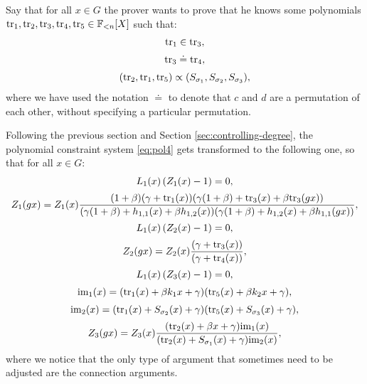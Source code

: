 \begin{example}\label{sec:concrete-example}
Say that for all $x \in G$ the prover wants to prove that he knows some polynomials $\text{tr}_1,\text{tr}_2,\text{tr}_3,\text{tr}_4,\text{tr}_5 \in \mathbb{F}_{<n}[X]$ such that:
\begin{align}\label{eq:pol4}
\begin{array}{c}
\text{tr}_1 \in \text{tr}_3, \\[0.2cm]
\text{tr}_3 \doteq \text{tr}_4, \\[0.2cm]
(\text{tr}_2,\text{tr}_1,\text{tr}_5) \propto (S_{\sigma_1},S_{\sigma_2},S_{\sigma_3}),
\end{array}
\end{align}
where we have used the notation $\doteq$ to denote that $c$ and $d$ are a permutation of each other, without specifying a particular permutation.

Following the previous section and Section \ref{sec:controlling-degree}, the polynomial constraint system \eqref{eq:pol4} gets transformed to the following one, so that for all $x \in G$:
\begin{align*}
\begin{array}{c}
  L_1(x) \left( Z_1(x) - 1\right) = 0, \\[0.2cm]
Z_1(gx) = \displaystyle Z_1(x)\frac{(1+\beta)(\gamma + \text{tr}_1(x))(\gamma(1+\beta) + \text{tr}_3(x) + \beta \text{tr}_3(gx))}{(\gamma(1+\beta) + {h_{1,1}}(x) + \beta {h_{1,2}}(x))(\gamma(1+\beta) + {h_{1,2}}(x) + \beta {h_{1,1}}(gx))}, \\[0.4cm]
L_1(x) \left( Z_2(x) - 1\right) = 0, \\[0.2cm]
Z_2(g x) = \displaystyle Z_2(x)\frac{(\gamma + \text{tr}_3(x))}{(\gamma + \text{tr}_4(x))}, \\[0.4cm]
L_1(x) \left( Z_3(x) - 1\right) = 0, \\[0.2cm]
\text{im}_1(x) = (\text{tr}_1(x) + \beta k_1x + \gamma)(\text{tr}_5(x) + \beta k_2x + \gamma), \\[0.2cm]
\text{im}_2(x) = (\text{tr}_1(x) + S_{\sigma_2}(x) + \gamma)(\text{tr}_5(x) + S_{\sigma_3}(x) + \gamma), \\[0.2cm]
Z_3(g x) = \displaystyle Z_3(x)\frac{(\text{tr}_2(x) + \beta x + \gamma) \text{im}_1(x)}{(\text{tr}_2(x) + S_{\sigma_1}(x) + \gamma)\text{im}_2(x)},
\end{array}
\end{align*}
where we notice that the only type of argument that sometimes need to be adjusted are the connection arguments.
\end{example}


